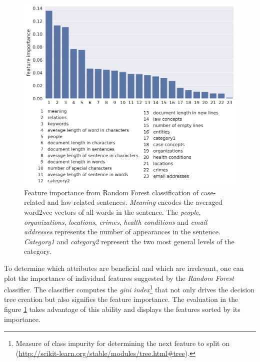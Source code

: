 \documentclass[
  digital, %
  notable,   %
  nolof,     %
  nolot,     %
]{fithesis3}
\begin{document}
\begin{figure}[H]
\caption{Feature importance from Random Forest classification of case-related and law-related sentences. \textit{Meaning} encodes the averaged word2vec vectors of all words in the sentence. The \textit{people}, \textit{organizations}, \textit{locations}, \textit{crimes}, \textit{health conditions} and \textit{email addresses} represents the number of appearances in the sentence. \textit{Category1} and \textit{category2} represent the two most general levels of the category.}
\label{fig:case_law_feature_importance}
\includegraphics[width=\textwidth]{img/case_law_feature_importance}
\end{figure}

To determine which attributes are beneficial and which are irrelevant, one can plot the importance of individual features suggested by the \textit{Random Forest} classifier.
The classifier computes the \textit{gini index}\footnote{Measure of class impurity for determining the next feature to split on \\(\url{http://scikit-learn.org/stable/modules/tree.html\#tree}).} that not only drives the decision tree creation but also signifies the feature importance.
The evaluation in the figure \ref{fig:case_law_feature_importance} takes advantage of this ability and displays the features sorted by its importance.
\end{document}
